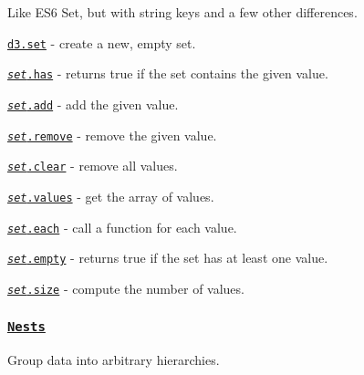 Like E\+S6 Set, but with string keys and a few other differences.


\begin{DoxyItemize}
\item \href{https://github.com/d3/d3-collection/blob/master/README.md#set}{\tt d3.\+set} -\/ create a new, empty set.
\item \href{https://github.com/d3/d3-collection/blob/master/README.md#set_has}{\tt {\itshape set}.has} -\/ returns true if the set contains the given value.
\item \href{https://github.com/d3/d3-collection/blob/master/README.md#set_add}{\tt {\itshape set}.add} -\/ add the given value.
\item \href{https://github.com/d3/d3-collection/blob/master/README.md#set_remove}{\tt {\itshape set}.remove} -\/ remove the given value.
\item \href{https://github.com/d3/d3-collection/blob/master/README.md#set_clear}{\tt {\itshape set}.clear} -\/ remove all values.
\item \href{https://github.com/d3/d3-collection/blob/master/README.md#set_values}{\tt {\itshape set}.values} -\/ get the array of values.
\item \href{https://github.com/d3/d3-collection/blob/master/README.md#set_each}{\tt {\itshape set}.each} -\/ call a function for each value.
\item \href{https://github.com/d3/d3-collection/blob/master/README.md#set_empty}{\tt {\itshape set}.empty} -\/ returns true if the set has at least one value.
\item \href{https://github.com/d3/d3-collection/blob/master/README.md#set_size}{\tt {\itshape set}.size} -\/ compute the number of values.
\end{DoxyItemize}

\subsubsection*{\href{https://github.com/d3/d3-collection/blob/master/README.md#nests}{\tt Nests}}

Group data into arbitrary hierarchies.


